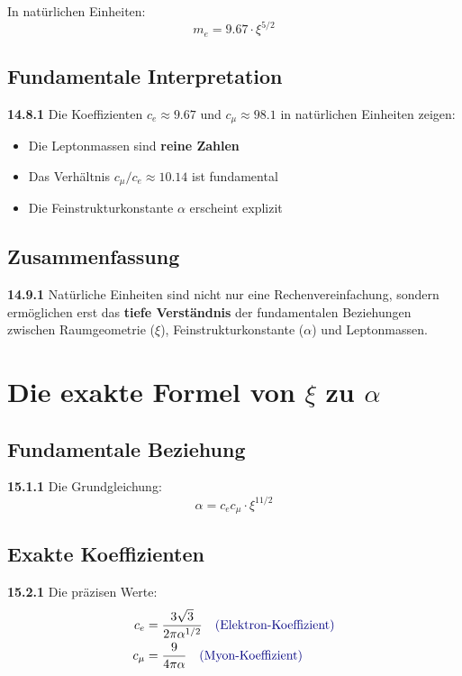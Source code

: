 \documentclass[12pt,a4paper]{article}
\begin{document}
In natürlichen Einheiten:
\[
m_e = 9.67 \cdot \xi^{5/2}
\]

\subsection{Fundamentale Interpretation}

\noindent \textbf{14.8.1} Die Koeffizienten $c_e \approx 9.67$ und $c_\mu \approx 98.1$ in natürlichen Einheiten zeigen:

\begin{itemize}
	\item Die Leptonmassen sind \textbf{reine Zahlen}
	\item Das Verhältnis $c_\mu/c_e \approx 10.14$ ist fundamental
	\item Die Feinstrukturkonstante $\alpha$ erscheint explizit
\end{itemize}

\subsection{Zusammenfassung}

\noindent \textbf{14.9.1} Natürliche Einheiten sind nicht nur eine Rechenvereinfachung, sondern ermöglichen erst das \textbf{tiefe Verständnis} der fundamentalen Beziehungen zwischen Raumgeometrie ($\xi$), Feinstrukturkonstante ($\alpha$) und Leptonmassen.


\section{Die exakte Formel von $\xi$ zu $\alpha$}

\subsection{Fundamentale Beziehung}

\noindent \textbf{15.1.1} Die Grundgleichung:
\[
\boxed{\alpha = c_e c_\mu \cdot \xi^{11/2}}
\]

\subsection{Exakte Koeffizienten}

\noindent \textbf{15.2.1} Die präzisen Werte:
\begin{align*}
	c_e &= \frac{3\sqrt{3}}{2\pi\alpha^{1/2}} \quad \textcolor{deepblue}{\text{(Elektron-Koeffizient)}} \\
	c_\mu &= \frac{9}{4\pi\alpha} \quad \textcolor{deepblue}{\text{(Myon-Koeffizient)}}
\end{align*}
\end{document}
